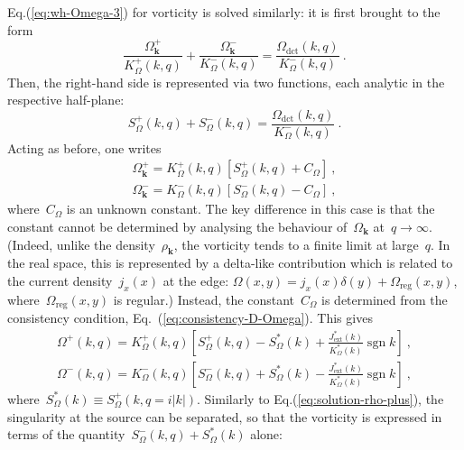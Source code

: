 \documentclass[preprint,aps,eqsecnum, prb]{revtex4-1}
\newcommand{\fplus}[1]{{#1}^{+}}
\newcommand{\fminus}[1]{{#1}^{-}}
\newcommand{\sgn}{\mathop{\mathrm{sgn}}\nolimits}
\newcommand{\dct}[1]{{#1}_\mathrm{dct}}
\begin{document}
Eq.(\ref{eq:wh-Omega-3}) for vorticity is solved similarly: it is first
brought to the form
\begin{equation}
  \frac{\fplus{\Omega}_{\bm k}}{\fplus{K}_\Omega(k, q)}
+ \frac{\fminus{\Omega}_{\bm k}}{\fminus{K}_\Omega(k, q)} =
\frac{\dct{\Omega}(k, q)}{\fminus{K}_\Omega(k, q)}
\ .
\end{equation}
Then, the right-hand side is represented via two functions,
each analytic in the respective half-plane:
\begin{equation}
  \label{eq:psi-def}
  \fplus{S}_\Omega(k, q) + \fminus{S}_\Omega(k, q)
  = \frac{\dct{\Omega}(k, q)}{\fminus{K}_\Omega(k, q)}
  \ .
\end{equation}
Acting as before, one writes
\begin{align}
  \fplus{\Omega}_{\bm k} = \fplus{K}_\Omega(k, q) \left[\fplus{S}_\Omega(k, q)
  + C_\Omega\right]
  \ ,
  \\
  \fminus{\Omega}_{\bm k} = \fminus{K}_\Omega(k, q) \left[
  \fminus{S}_\Omega(k, q)
  - C_\Omega\right]
  \ ,
\end{align}
where~$C_\Omega$ is an unknown constant. The key difference in this case
is that the constant cannot be determined by analysing  the behaviour
of~$\Omega_{\bm k}$ at~$q \to \infty$.
(Indeed, unlike the density~$\rho_{\bm k}$,
the vorticity tends to a finite limit at large~$q$. In  the real space,
this is represented by a delta-like contribution which is related to the
current density~$j_x(x)$ at the edge:
$\Omega(x, y) = j_x(x) \delta(y) + \Omega_\mathrm{reg}(x, y)$,
where~$\Omega_\mathrm{reg}(x, y)$ is regular.)
Instead, the constant~$C_\Omega$ is determined from the consistency condition,
Eq.~(\ref{eq:consistency-D-Omega}). This gives
\begin{align}
  \label{eq:solution-omega-plus-0}
  \fplus{\Omega}(k, q)
  = \fplus{K}_\Omega(k, q)  \left[\fplus{S}_\Omega(k, q) - S_\Omega^\ast(k) +
  \frac{J_\mathrm{ext}^\ast(k)}{K_\Omega^\ast(k)}\sgn{k} \right]
  \ ,
  \\
  \label{eq:solution-omega-minus}
  \fminus{\Omega}(k, q) = \fminus{K}_\Omega(k, q)
  \left[\fminus{S}_\Omega(k, q) + S_\Omega^\ast(k)
  - \frac{J_\mathrm{ext}^\ast(k)}{K_\Omega^\ast(k)} \sgn{k}\right]
  \ ,
\end{align}
where~$S_\Omega^\ast(k) \equiv \fplus{S}_\Omega(k, q = i |k|)$. Similarly to Eq.(\ref{eq:solution-rho-plus}), the singularity at the source can
be separated, so that the vorticity is
expressed in terms of the quantity~$\fminus{S}_\Omega(k, q)
+ S_\Omega^\ast(k)$ alone:
\end{document}
